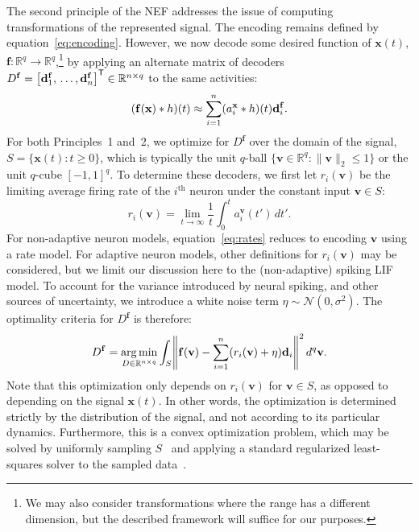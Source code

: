 \documentclass[12pt]{article}
\theoremstyle{definition}
\DeclareMathOperator*{\argmin}{arg\,min}
\renewcommand{\vec}{\mathbf}  %
\newcommand{\transpose}[1]{{#1}^\mathsf{T}}
\let\originalleft\left
\let\originalright\right
\renewcommand{\left}{\mathopen{}\mathclose\bgroup\originalleft}
\renewcommand{\right}{\aftergroup\egroup\originalright}
\begin{document}
The second principle of the NEF addresses the issue of computing transformations of the represented signal.
The encoding remains defined by equation~\ref{eq:encoding}.
However, we now decode some desired function of $\vec{x}(t)$, $\vec{f} : \mathbb{R}^q \rightarrow \mathbb{R}^q$,\footnote{
We may also consider transformations where the range has a different dimension, but the described framework will suffice for our purposes.}
by applying an alternate matrix of decoders $D^\vec{f} = \transpose{\left[ \vec{d}^\vec{f}_1\text{,}\, \ldots\text{,}\, \vec{d}^\vec{f}_n \right]} \in \mathbb{R}^{n \times q}$ to the same activities:
\begin{equation} \label{eq:trans-decode}
\left( \vec{f}(\vec{x}) \ast h \right)(t) \approx \sum_{i=1}^n (a_i^\vec{x} \ast h)(t) \vec{d}^\vec{f}_i \text{.}
\end{equation}
For both Principles~1 and~2, we optimize for $D^\vec{f}$ over the domain of the signal, $S = \{\vec{x}(t) : t \ge 0\}$, which is typically the unit $q$-ball $\{ \vec{v} \in \mathbb{R}^q : \|\vec{v}\|_2 \le 1\}$ or the unit $q$-cube $[-1\text{,}\, 1]^q$.
To determine these decoders, we first let $r_i(\vec{v})$ be the limiting average firing rate of the $i^{\text{th}}$ neuron under the constant input $\vec{v} \in S$:
\begin{equation} \label{eq:rates}
r_i(\vec{v}) = \lim_{t \rightarrow \infty} \frac{1}{t} \int_{0}^t a_i^\vec{v}(t') \, dt' \text{.}
\end{equation}
For non-adaptive neuron models, equation~\ref{eq:rates} reduces to encoding $\vec{v}$ using a rate model.
For adaptive neuron models, other definitions for $r_i(\vec{v})$ may be considered, but we limit our discussion here to the (non-adaptive) spiking LIF model.
To account for the variance introduced by neural spiking, and other sources of uncertainty, we introduce a white noise term $\eta \sim \mathcal{N}(0, \sigma^2)$.
The optimality criteria for $D^\vec{f}$ is therefore:
\begin{equation} \label{eq:decoder_solution}
D^\vec{f} = \argmin_{D \in \mathbb{R}^{n \times q}} \int_{S} \left\| \vec{f}(\vec{v}) - \sum_{i=1}^n (r_i(\vec{v}) + \eta) \vec{d}_i \right\|^2 \, d^q\vec{v} \text{.}
\end{equation}
Note that this optimization only depends on $r_i(\vec{v})$ for $\vec{v} \in S$, as opposed to depending on the signal $\vec{x}(t)$.
In other words, the optimization is determined strictly by the distribution of the signal, and not according to its particular dynamics.
Furthermore, this is a convex optimization problem, which may be solved by uniformly sampling $S$~\citep{voelker2017} and applying a standard regularized least-squares solver to the sampled data~\citep{bekolay2013nengo}.
\end{document}
